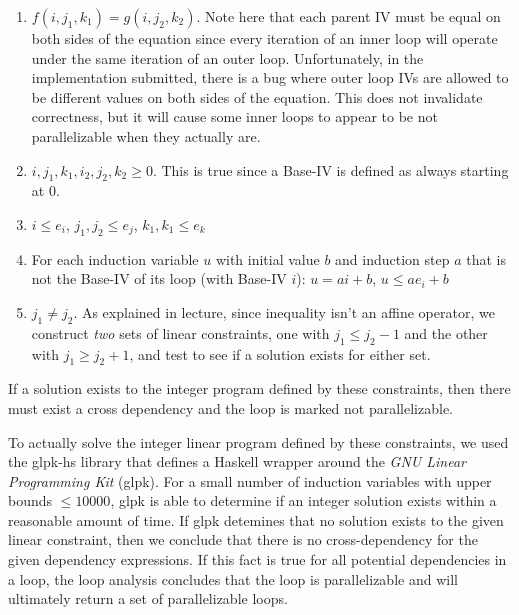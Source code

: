 \documentclass[11pt]{article}
\begin{document}
\begin{enumerate}

\item $f(i, j_1, k_1) = g(i, j_2, k_2)$. Note here that each parent IV
  must be equal on both sides of the equation since every iteration of
  an inner loop will operate under the same iteration of an outer
  loop. Unfortunately, in the implementation submitted, there is a bug
  where outer loop IVs are allowed to be different values on both
  sides of the equation. This does not invalidate correctness, but it
  will cause some inner loops to appear to be not parallelizable when
  they actually are. 

\item $i, j_1, k_1, i_2, j_2, k_2 \geq 0$. This is true since a
  Base-IV is defined as always starting at $0$.

\item $i \leq e_i$, $j_1, j_2 \leq e_j$, $k_1, k_1 \leq e_k$

\item For each induction variable $u$ with initial value $b$ and
  induction step $a$ that is not the Base-IV of its
  loop (with Base-IV $i$): $u = ai + b$, $u \leq ae_i + b$ 

\item $j_1 \neq j_2$. As explained in lecture, since inequality isn't
  an affine operator, we construct \emph{two} sets of linear
  constraints, one with $j_1 \leq j_2-1$ and the other with $j_1 \geq
  j_2 + 1$, and test to see if a solution exists for either set.

\end{enumerate}

If a solution exists to the integer program defined by these
constraints, then there must exist a cross dependency and the loop is
marked not parallelizable. 

To actually solve the integer linear program defined by these
constraints, we used the glpk-hs library that defines a Haskell
wrapper around the \emph{GNU Linear Programming Kit} (glpk). For a
small number of induction variables with upper bounds $\leq 10000$,
glpk is able to determine if an integer solution exists within a
reasonable amount of time. If glpk detemines that no solution exists
to the given linear constraint, then we conclude that there is no
cross-dependency for the given dependency expressions. If this fact is
true for all potential dependencies in a loop, the loop analysis
concludes that the loop is parallelizable and will ultimately return a
set of parallelizable loops.
\end{document}
